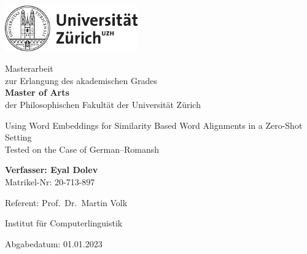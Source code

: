 \begin{titlepage}
\includegraphics[height=20mm]{graphics/uzh_logo_d_pos}\\

\begin{center}

{
Masterarbeit \\
zur Erlangung des akademischen Grades \\
\textbf{Master of Arts} \\
der Philosophischen Fakultät der Universität Zürich \\

\vspace{2cm}

{\Huge Using Word Embeddings for Similarity Based Word Alignments in a Zero-Shot Setting}\\
\vspace{0.5cm}
{\huge Tested on the Case of German--Romansh}\\

\vspace{4cm}

\textbf{Verfasser: Eyal Dolev} \\
	Matrikel-Nr: 20-713-897 \\

\vspace{2cm}

Referent: Prof.~Dr.~Martin Volk


Institut für Computerlinguistik

\vfill Abgabedatum: 01.01.2023

\vspace{3cm}
}
\end{center}

\end{titlepage}

\newpage

